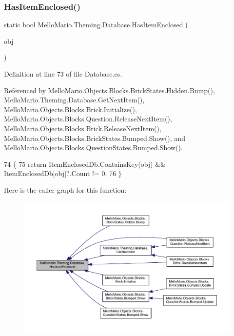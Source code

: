 \subsubsection{Has\+Item\+Enclosed()}
{\footnotesize\ttfamily static bool Mello\+Mario.\+Theming.\+Database.\+Has\+Item\+Enclosed (\begin{DoxyParamCaption}\item[{\textbf{ I\+Game\+Object}}]{obj }\end{DoxyParamCaption})\hspace{0.3cm}{\ttfamily [static]}}



Definition at line 73 of file Database.\+cs.



Referenced by Mello\+Mario.\+Objects.\+Blocks.\+Brick\+States.\+Hidden.\+Bump(), Mello\+Mario.\+Theming.\+Database.\+Get\+Next\+Item(), Mello\+Mario.\+Objects.\+Blocks.\+Brick.\+Initialize(), Mello\+Mario.\+Objects.\+Blocks.\+Question.\+Release\+Next\+Item(), Mello\+Mario.\+Objects.\+Blocks.\+Brick.\+Release\+Next\+Item(), Mello\+Mario.\+Objects.\+Blocks.\+Brick\+States.\+Bumped.\+Show(), and Mello\+Mario.\+Objects.\+Blocks.\+Question\+States.\+Bumped.\+Show().


\begin{DoxyCode}
74         \{
75             \textcolor{keywordflow}{return} ItemEnclosedDb.ContainsKey(obj) && ItemEnclosedDb[obj]?.Count != 0;
76         \}
\end{DoxyCode}
Here is the caller graph for this function\+:
\nopagebreak
\begin{figure}[H]
\begin{center}
\leavevmode
\includegraphics[width=350pt]{classMelloMario_1_1Theming_1_1Database_a847b37218838dfb96413ba40edcebca3_icgraph}
\end{center}
\end{figure}
\mbox{\label{classMelloMario_1_1Theming_1_1Database_a1a15a0f194ce2c9e9cc701656794f092}} 
